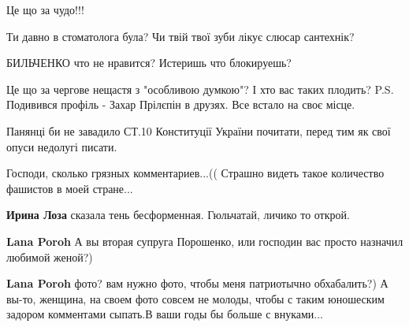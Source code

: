 \begin{itemize}
Це що за чудо!!!


Ти давно в стоматолога була?
Чи твій твої зуби лікує слюсар сантехнік?


БИЛЬЧЕНКО что не нравится? Истеришь что блокируешь?


Це що за чергове нещастя з "особливою думкою"? І хто вас таких плодить? P.S. Подивився профіль - Захар Прілєпін в друзях. Все встало на своє місце.


Панянці би не завадило СТ.10 Конституції України почитати, перед тим як свої опуси недолугі писати.


Господи, сколько грязных комментариев...(( Страшно видеть такое количество фашистов в моей стране...

\begin{itemize}

\textbf{Ирина Лоза} сказала тень бесформенная. Гюльчатай, личико то открой.


\textbf{Lana Poroh} А вы вторая супруга Порошенко, или господин вас просто назначил любимой женой?)


\textbf{Lana Poroh} фото? вам нужно фото, чтобы меня патриотычно обхабалить?) А вы-то, женщина, на своем фото совсем не молоды, чтобы с таким юношеским задором комментами сыпать.\Smiley[1.0][yellow] В ваши годы бы больше с внуками...


\end{itemize}
\end{itemize}
